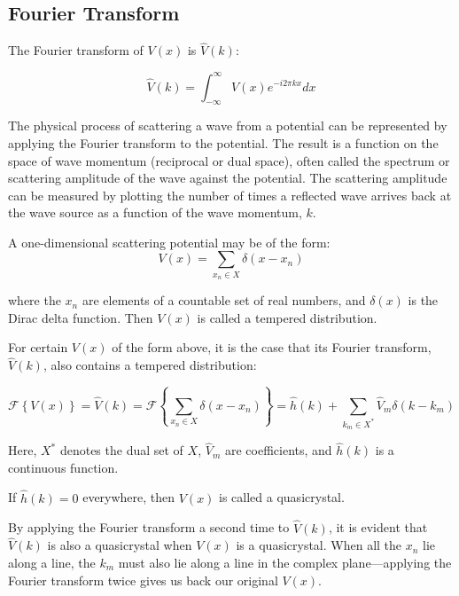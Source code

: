 \documentclass[11pt, oneside]{article}
\begin{document}
\subsection{Fourier Transform}
The Fourier transform of $V(x)$ is $\hat{V}(k)$:

\begin{equation}
\hat{V}(k) = \int_{-\infty}^{\infty}V(x)e^{-i2\pi kx}dx
\end{equation}

The physical process of scattering a wave from a potential can be represented by applying the Fourier transform to the potential. The result is a function on the space of wave momentum (reciprocal or dual space), often called the spectrum or scattering amplitude of the wave against the potential. The scattering amplitude can be measured by plotting the number of times a reflected wave arrives back at the wave source as a function of the wave momentum, $k$.

A one-dimensional scattering potential may be of the form:
\begin{equation}
V(x) = \sum_{x_n \in X}\delta(x - x_n)
\end{equation} 
 
where the $x_n$ are elements of a countable set of real numbers, and $\delta(x)$ is the Dirac delta function. Then $V(x)$ is called a tempered distribution.

For certain $V(x)$ of the form above, it is the case that its Fourier transform, $\hat{V}(k)$, also contains a tempered distribution:
  
\begin{equation}
 \label{eq: RiemannFourier}
 \mathcal{F}\left \{V(x)\right \} = \hat{V}(k) = \mathcal{F}\left \{ \sum_{x_n \in X}\delta(x - x_n) \right \} = \hat{h}(k) +  \sum_{k_m \in X^{*}} \hat{V}_{m} \delta(k - k_{m})
\end{equation}

Here, $X^*$ denotes the dual set of $X$, $\hat{V}_{m}$ are coefficients, and $\hat{h}(k)$ is a continuous function.

If $\hat{h}(k) = 0$ everywhere, then $V(x)$ is called a quasicrystal.

By applying the Fourier transform a second time to $\hat{V}(k)$, it is evident that $\hat{V}(k)$ is also a quasicrystal when $V(x)$ is a quasicrystal. When all the $x_n$ lie along a line, the $k_m$ must also lie along a line in the complex plane—applying the Fourier transform twice gives us back our original $V(x)$.
\end{document}
